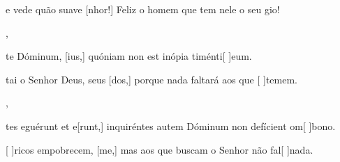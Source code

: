 {        {\item {} e vede quão suave [nhor!] Feliz o homem que tem nele o seu gio!},
    {\item {}te Dóminum, [ius,] quóniam non est inópia timénti[ ]{e}um.}%
        {\item {}tai o Senhor Deus, seus [dos,] porque nada faltará aos que [ ]{te}mem.},
    {\item {}tes eguérunt et e[runt,] inquiréntes autem Dóminum non defícient om[ ]{bo}no.}%
        {\item {}[ ]{ri}cos empobrecem, [me,] mas aos que buscam o Senhor não fal[ ]{na}da.}
}
